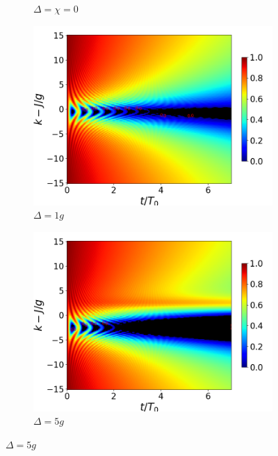 \begin{figure}[h!]
\begin{subfigure}{0.49\textwidth}
        \caption{$\Delta=\chi=0$}
        \label{fig4:concu k 0 dis}
    \end{subfigure}
    \vfill
    \begin{subfigure}{0.49\textwidth}
        \includegraphics[width=\textwidth]{figuras/ch4/concu/k/eg0+ge0 d=1.0g x=0.0g J=15.0g gamma=0.25g concu k dis.png}
        \caption{$\Delta=1g$}
        \label{fig4:concu k d1}
    \end{subfigure}
    \hfill
    \begin{subfigure}{0.49\textwidth}
        \includegraphics[width=\textwidth]{figuras/ch4/concu/k/eg0+ge0 d=5.0g x=0.0g J=15.0g gamma=0.25g concu k dis.png}
        \caption{$\Delta=5g$}
        \label{fig4:concu k d2}
    \end{subfigure}

\end{figure}

